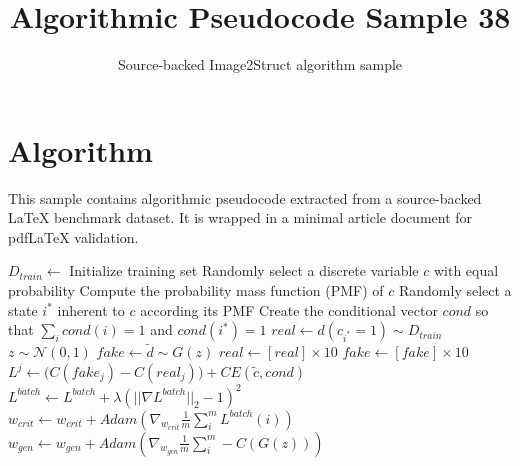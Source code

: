 \documentclass[11pt]{article}
\title{Algorithmic Pseudocode Sample 38}
\author{Source-backed Image2Struct algorithm sample}
\date{}
\begin{document}
\maketitle
\section{Algorithm}
This sample contains algorithmic pseudocode extracted from a source-backed LaTeX benchmark dataset. It is wrapped in a minimal article document for pdfLaTeX validation.

\begin{algorithm}[htbp]
\caption{Source-backed algorithmic procedure}
\begin{algorithmic}[1]
\State $D_{train} \gets$ Initialize training set
 
\State Randomly select a discrete variable $c$ with equal probability
\State Compute the probability mass function (PMF) of $c$
\State Randomly select a state $i^*$ inherent to $c$ according its PMF
\State Create the conditional vector $cond$ so that $\sum_i cond(i) = 1$ and $cond(i^*)=1$
 
\State $real \gets d(c_{i^*}=1)\sim D_{train}$ 
\State $z \sim \mathcal{N}(0,1)$ 
\State $fake \gets \tilde{d} \sim G(z)$ 
\State $real \gets [real]\times 10$ 
\State $fake \gets [fake] \times 10$
\State $L^j \gets \big( C(fake_j) - C(real_j)\big) + CE(\tilde{c}, cond)$
\State $L^{batch} \gets L^{batch} + \lambda(||\nabla L^{batch} ||_{2} - 1)^2$ 
\State $w_{crit} \gets w_{crit} + Adam(\nabla_{w_{crit}}\frac{1}{m}\sum_i^m L^{batch}(i))$ 
 
\State $w_{gen} \gets w_{gen} + Adam(\nabla_{w_{gen}}\frac{1}{m}\sum_i^m -C(G(z)))$ 
\EndIf
\EndFor
\EndWhile
\end{algorithmic}
\end{algorithm}
\end{document}
